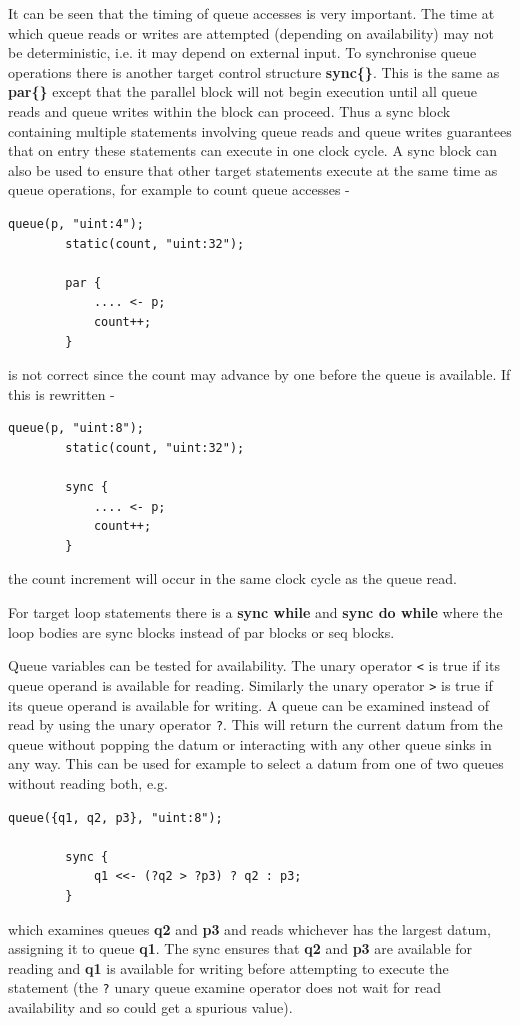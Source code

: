 \documentclass[10pt,a4paper,twoside,fleqn]{article}
\newcommand{\kwd}[1]{{\bf #1}} %
\newcommand{\var}[1]{{\bf #1}} %
\begin{document}
    It can be seen that the timing of queue accesses is very important. The time
    at which queue reads or writes are attempted (depending on availability) may
    not be deterministic, i.e. it may depend on external input. To synchronise
    queue operations there is another target control structure \kwd{sync\{\}}.
    This is the same as \kwd{par\{\}} except that the parallel block will
    not begin execution until all queue reads and queue writes within the block
    can proceed. Thus a sync block containing multiple statements involving
    queue reads and queue writes guarantees that on entry these statements can
    execute in one clock cycle. A sync block can also be used to ensure that
    other target statements execute at the same time as queue operations, for
    example to count queue accesses -
    \begin{lstlisting}[language=threepl]
        queue(p, "uint:4");
        static(count, "uint:32");
        
        par {
            .... <- p;
            count++;
        }
    \end{lstlisting}
    is not correct since the count may advance by one before the queue is
    available. If this is rewritten -
    \begin{lstlisting}[language=threepl]
        queue(p, "uint:8");
        static(count, "uint:32");
        
        sync {
            .... <- p;
            count++;
        }
    \end{lstlisting}
    the count increment will occur in the same clock cycle as the queue read.

    For target loop statements there is a \kwd{sync while} and \kwd{sync do while}
    where the loop bodies are sync blocks instead of par blocks or seq blocks.
     
    Queue variables can be tested for availability. The unary operator \verb'<'
    is true if its queue operand is available for reading. Similarly the unary
    operator \verb'>' is true if its queue operand is available for writing. A
    queue can be examined instead of read by using the unary operator \verb'?'.
    This will return the current datum from the queue without popping the datum
    or interacting with any other queue sinks in any way. This can be used for
    example to select a datum from one of two queues without reading both, e.g.
    \begin{lstlisting}[language=threepl]
        queue({q1, q2, p3}, "uint:8");
        
        sync {
            q1 <<- (?q2 > ?p3) ? q2 : p3;
        }
    \end{lstlisting}
    which examines queues \var{q2} and \var{p3} and reads whichever has the largest
    datum,  assigning it to queue \var{q1}. The sync ensures that \var{q2} and
    \var{p3} are available for reading and \var{q1} is available for writing
    before attempting to execute the statement (the \verb'?' unary queue examine
    operator does not wait for read availability and so could get a spurious
    value).
    
\end{document}
